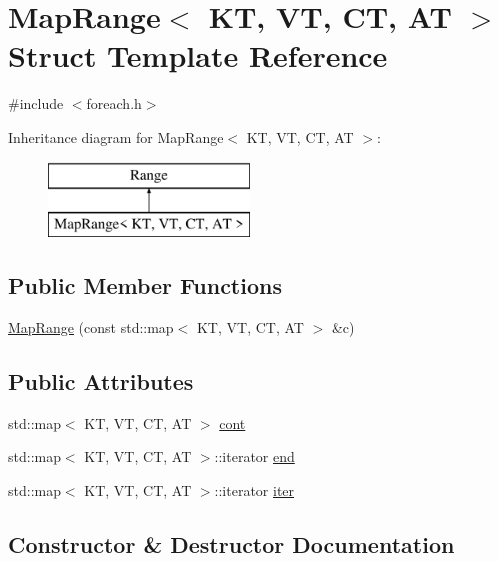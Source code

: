 \hypertarget{struct__fe_1_1MapRange}{}\section{Map\+Range$<$ KT, VT, CT, AT $>$ Struct Template Reference}
\label{struct__fe_1_1MapRange}


{\ttfamily \#include $<$foreach.\+h$>$}

Inheritance diagram for Map\+Range$<$ KT, VT, CT, AT $>$\+:\begin{figure}[H]
\begin{center}
\leavevmode
\includegraphics[height=2.000000cm]{struct__fe_1_1MapRange}
\end{center}
\end{figure}
\subsection*{Public Member Functions}
\begin{DoxyCompactItemize}
\item 
\mbox{\hyperlink{struct__fe_1_1MapRange_a1c4f305ae06f132eb82391e315133a17}{Map\+Range}} (const std\+::map$<$ KT, VT, CT, AT $>$ \&c)
\end{DoxyCompactItemize}
\subsection*{Public Attributes}
\begin{DoxyCompactItemize}
\item 
std\+::map$<$ KT, VT, CT, AT $>$ \mbox{\hyperlink{struct__fe_1_1MapRange_ae44675b7de025bb84cb1064001e8e331}{cont}}
\item 
std\+::map$<$ KT, VT, CT, AT $>$\+::iterator \mbox{\hyperlink{struct__fe_1_1MapRange_a9d26c2a88c3625754ac70dc410a27ce3}{end}}
\item 
std\+::map$<$ KT, VT, CT, AT $>$\+::iterator \mbox{\hyperlink{struct__fe_1_1MapRange_aa1d20cb5ad8261fc478353e6d6cac2cf}{iter}}
\end{DoxyCompactItemize}


\subsection{Constructor \& Destructor Documentation}
\mbox{\label{struct__fe_1_1MapRange_a1c4f305ae06f132eb82391e315133a17}} 
